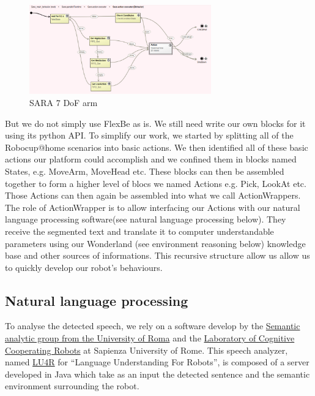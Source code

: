 \documentclass[runningheads,a4paper]{llncs}
\begin{document}
\begin{figure}[h!]
	\centering
	\includegraphics[width=0.70\textwidth]{images/flexbe.png}
	\caption{SARA 7 DoF arm}
\end{figure}

But we do not simply use FlexBe as is. We still need write our own blocks for it using its python API. To simplify our work, we started by splitting all of the Robocup@home scenarios into basic actions. We then identified all of these basic actions our platform could accomplish and we confined them in blocks named States, e.g. MoveArm, MoveHead etc. These blocks can then be assembled together to form a higher level of blocs we named Actions e.g. Pick, LookAt etc. Those Actions can then again be assembled into what we call ActionWrappers. The role of ActionWrapper is to allow interfacing our Actions with our natural language processing software(see natural language processing below). They receive the segmented text and translate it to computer understandable parameters using our Wonderland (see environment reasoning below) knowledge base and other sources of informations. This recursive structure allow us allow us to quickly develop our robot’s behaviours.\\

\subsection{Natural language processing}
\tab To analyse the detected speech, we rely on a software develop by the  \href{http://sag.art.uniroma2.it/}{Semantic analytic group from the University of Roma} and the \href{http://labrococo.dis.uniroma1.it/}{Laboratory of Cognitive Cooperating Robots} at Sapienza University of Rome. This speech analyzer, named \href{http://sag.art.uniroma2.it/lu4r.html}{LU4R} for “Language Understanding For Robots”, is composed of a server developed in Java which take as an input the detected sentence and the semantic environment surrounding the robot.\\
\end{document}
